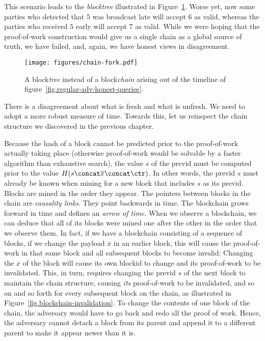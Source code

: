This scenario leads to the \emph{blocktree} illustrated in Figure~\ref{fig.chain-fork}.
Worse yet, now some parties who detected that $5$ was broadcast late will accept $6$ as valid, whereas
the parties who received $5$ early will accept $7$ as valid. While we were hoping that the proof-of-work
construction would give us a single chain as a global source of truth, we have failed, and, again,
we have honest views in disagreement.

\begin{figure}[h]
    \centering
    \texttt{[image: figures/chain-fork.pdf]}
    \caption{A block\emph{tree} instead of a block\emph{chain} arising out of the timeline
             of figure~\ref{fig.regular-adv-honest-queries}.}
    \label{fig.chain-fork}
\end{figure}

There is a disagreement about what is fresh and what is unfresh. We need to adopt a more
robust measure of time. Towards this, let us reinspect the chain structure we discovered
in the previous chapter.

Because the hash of a block cannot be predicted prior to the proof-of-work actually taking place
(otherwise proof-of-work would be solvable by a faster algorithm than exhaustive search),
the value
$s$ of the previd must be computed prior to the value $H(s \concat \overline{x} \concat \ctr)$.
In other words, the previd $s$ must already be known when mining for a new block that includes
$s$ as its previd. Blocks are mined in the order they appear. The pointers between blocks
in the chain are \emph{causality links}. They point backwards in time. The blockchain grows
forward in time and defines an \emph{arrow of time}. When we observe a blockchain, we can
deduce that all of its blocks were mined one after the other in the order that we observe
them. In fact, if we have a blockchain consisting of a sequence of blocks, if we change
the payload $\overline{x}$ in an earlier block, this will cause the proof-of-work in that
same block and all subsequent blocks to become invalid: Changing the $\overline{x}$ of the
block will cause its own blockid to change and its proof-of-work to be invalidated. This, in
turn, requires changing the previd $s$ of the next block to maintain the chain structure,
causing \emph{its} proof-of-work to
be invalidated, and so on and so forth for every subsequent block on the chain, as
illustrated in Figure~\ref{fig.blockchain-invalidation}. To change
the contents of one block of the chain, the adversary would have to go back and redo all
the proof of work. Hence, the adversary cannot detach a block from its parent and append
it to a different parent to make it appear newer than it is.

